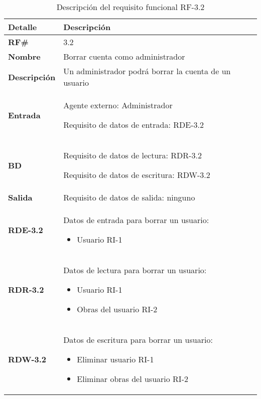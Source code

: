 \begin{table}[H]
    \centering
    \begin{tabular}{|p{3cm}|p{8cm}|}
        \hline
        \rowcolor{lightgray}
        \textbf{Detalle} & \textbf{Descripción} \\
        \hline
        \textbf{RF\#} & 3.2 \\
        \hline
        \textbf{Nombre} & Borrar cuenta como administrador \\
        \hline
        \textbf{Descripción} & Un administrador podrá borrar la cuenta de un usuario \\
        \hline
        \textbf{Entrada} &
        Agente externo: Administrador
        
        Requisito de datos de entrada: RDE-3.2 \\
        \hline
        \textbf{BD} &
        Requisito de datos de lectura: RDR-3.2
        
        Requisito de datos de escritura: RDW-3.2 \\
        \hline
        \textbf{Salida} & Requisito de datos de salida: ninguno \\
        \hline
        \textbf{RDE-3.2} & Datos de entrada para borrar un usuario:
            \begin{itemize}
                \item Usuario RI-1
            \end{itemize} \\
        \hline
        \textbf{RDR-3.2} & Datos de lectura para borrar un usuario:
            \begin{itemize}
                \item Usuario RI-1
                \item Obras del usuario RI-2
            \end{itemize} \\
        \hline
        \textbf{RDW-3.2} & Datos de escritura para borrar un usuario:
            \begin{itemize}
                \item Eliminar usuario RI-1
                \item Eliminar obras del usuario RI-2
            \end{itemize} \\
        \hline
    \end{tabular}
    \caption{Descripción del requisito funcional RF-3.2}
    \label{tab:rf-3-2}
\end{table}

